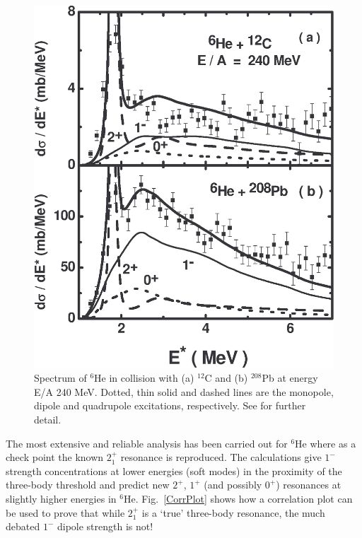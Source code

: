 \begin{figure}
\begin{center}
\includegraphics[scale=0.4]{figures/He6PbC2.eps}
\end{center}
\caption{Spectrum of $^6$He in collision with
(a) $^{12}$C  and (b) $^{208}$Pb at energy E/A 240 MeV. Dotted, thin
solid and dashed lines are the monopole, dipole and quadrupole
excitations, respectively.
See \protect\cite{ershov1} for further detail.
\label{He6PbC} }
\end{figure}

The most extensive and reliable analysis has been carried out for
$^6$He where as a check point the known $2^+_1$ resonance is
reproduced. The calculations give $1^-$ strength concentrations at
lower energies (soft modes) in the proximity of the three-body
threshold and predict new $2^+$, $1^+$ (and possibly $0^+$)
resonances at slightly higher energies in $^6$He.
Fig.~\ref{CorrPlot} shows how a correlation plot can be used to
prove that while $2^+_1$ is a `true' three-body resonance, the
much debated $1^-$ dipole strength is not!



